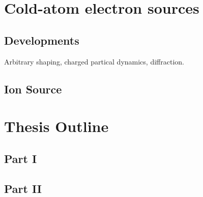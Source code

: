 \section{Cold-atom electron sources}

\subsection{Developments}

Arbitrary shaping, charged partical dynamics, diffraction.
\subsection{Ion Source}

\section{Thesis Outline}

\subsection{Part I}

\subsection{Part II}
